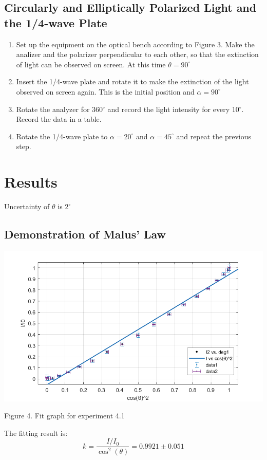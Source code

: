 \documentclass[12pt, a4paper]{article}
\begin{document}
\subsection{Circularly and Elliptically Polarized Light and the 1/4-wave Plate}

\begin{enumerate}
	\item Set up the equipment on the optical bench according to Figure 3. Make the analizer and the polarizer 
perpendicular to each other, so that the extinction of light can be observed on screen. At this time 
$\theta = 90^{\circ}$
	\item Insert the 1/4-wave plate and rotate it to make the extinction of the light observed on screen again. This is the initial 
position and $\alpha=90^{\circ}$ 
	\item Rotate the analyzer for 360$^{\circ}$ and record the light intensity for every 10$^{\circ}$. Record the data in a table.
	\item Rotate the 1/4-wave plate to $\alpha = 20^{\circ}$ and $\alpha = 45^{\circ}$ and repeat the previous step.
\end{enumerate}
\section{Results}
Uncertainty of $\theta$ is $2^{\circ}$

\subsection{Demonstration of Malus' Law}
\centerline{\includegraphics[scale = 0.6]{fig1.png}}
\centerline{Figure 4. Fit graph for experiment 4.1}

The fitting result is:
$$
	k = \frac{I/I_0}{\cos^2(\theta)} = 0.9921 \pm 0.051
$$
\end{document}
